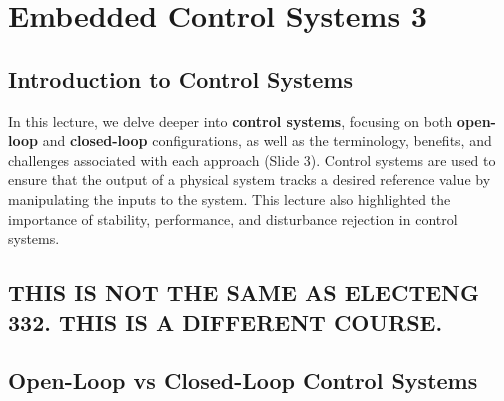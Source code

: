 \documentclass[
  14pt,
  a4paper,
  numbers=noendperiod,
  headinclude=true,
  footinclude=true,
  DIV=calc]{scrreprt}
\begin{document}
\chapter{Embedded Control Systems 3}\label{embedded-control-systems-3}

\section{Introduction to Control
Systems}\label{introduction-to-control-systems}

In this lecture, we delve deeper into \textbf{control systems}, focusing
on both \textbf{open-loop} and \textbf{closed-loop} configurations, as
well as the terminology, benefits, and challenges associated with each
approach (Slide 3). Control systems are used to ensure that the output
of a physical system tracks a desired reference value by manipulating
the inputs to the system. This lecture also highlighted the importance
of stability, performance, and disturbance rejection in control systems.

\begin{tcolorbox}[enhanced jigsaw, title=\textcolor{quarto-callout-important-color}{\faExclamation}\hspace{0.5em}{Important Note}, breakable, opacityback=0, opacitybacktitle=0.6, leftrule=.75mm, left=2mm, coltitle=black, colback=white, toptitle=1mm, titlerule=0mm, arc=.35mm, rightrule=.15mm, colbacktitle=quarto-callout-important-color!10!white, toprule=.15mm, bottomtitle=1mm, colframe=quarto-callout-important-color-frame, bottomrule=.15mm]

\section*{\texorpdfstring{\textbf{THIS IS NOT THE SAME AS ELECTENG 332.
THIS IS A DIFFERENT
COURSE.}}{THIS IS NOT THE SAME AS ELECTENG 332. THIS IS A DIFFERENT COURSE.}}\label{this-is-not-the-same-as-electeng-332.-this-is-a-different-course.}


\end{tcolorbox}

\section{Open-Loop vs Closed-Loop Control
Systems}\label{open-loop-vs-closed-loop-control-systems}
\end{document}
